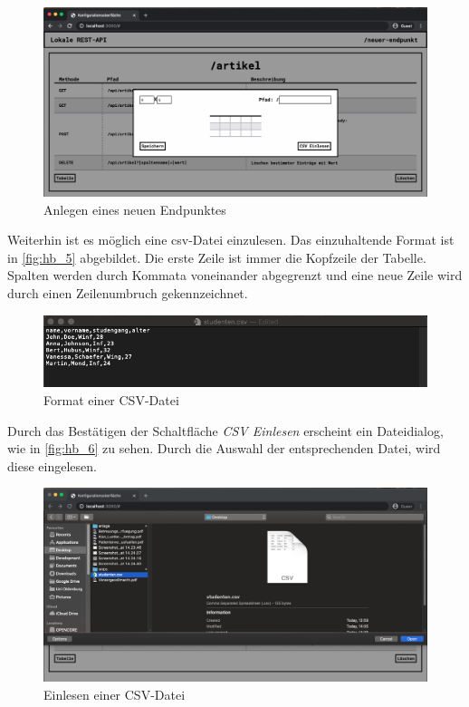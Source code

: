 \begin{figure}[H]
    \centering
    \includegraphics[width=15cm]{figures/hb_4.png}    %
    \caption{Anlegen eines neuen Endpunktes}
    \label{fig:hb_4}
\end{figure}
Weiterhin ist es möglich eine \gls{csv}-Datei einzulesen. Das einzuhaltende Format ist in \autoref{fig:hb_5} abgebildet. Die erste Zeile ist immer die Kopfzeile der Tabelle. Spalten werden durch Kommata voneinander abgegrenzt und eine neue Zeile wird durch einen Zeilenumbruch gekennzeichnet. 

\begin{figure}[H]
    \centering
    \includegraphics[width=15cm]{figures/hb_5.png}    %
    \caption{Format einer CSV-Datei}
    \label{fig:hb_5}
\end{figure}

Durch das Bestätigen der Schaltfläche \textit{CSV Einlesen} erscheint ein Dateidialog, wie in \autoref{fig:hb_6} zu sehen. Durch die Auswahl der entsprechenden Datei, wird diese eingelesen. 
\begin{figure}[H]
    \centering
    \includegraphics[width=15cm]{figures/hb_6.png}    %
    \caption{Einlesen einer CSV-Datei}
    \label{fig:hb_6}
\end{figure}

